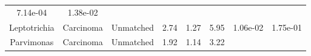 \documentclass[12pt,]{article}
\begin{document}
\begin{longtable}[]{@{}cccccccc@{}}
\begin{minipage}[t]{0.06\columnwidth}
7.14e-04\strut
\end{minipage} & \begin{minipage}[t]{0.06\columnwidth}\centering\strut
1.38e-02\strut
\end{minipage}\tabularnewline
\begin{minipage}[t]{0.19\columnwidth}\centering\strut
Leptotrichia\strut
\end{minipage} & \begin{minipage}[t]{0.07\columnwidth}\centering\strut
Carcinoma\strut
\end{minipage} & \begin{minipage}[t]{0.09\columnwidth}\centering\strut
Unmatched\strut
\end{minipage} & \begin{minipage}[t]{0.03\columnwidth}\centering\strut
2.74\strut
\end{minipage} & \begin{minipage}[t]{0.14\columnwidth}\centering\strut
1.27\strut
\end{minipage} & \begin{minipage}[t]{0.14\columnwidth}\centering\strut
5.95\strut
\end{minipage} & \begin{minipage}[t]{0.06\columnwidth}\centering\strut
1.06e-02\strut
\end{minipage} & \begin{minipage}[t]{0.06\columnwidth}\centering\strut
1.75e-01\strut
\end{minipage}\tabularnewline
\begin{minipage}[t]{0.19\columnwidth}\centering\strut
Parvimonas\strut
\end{minipage} & \begin{minipage}[t]{0.07\columnwidth}\centering\strut
Carcinoma\strut
\end{minipage} & \begin{minipage}[t]{0.09\columnwidth}\centering\strut
Unmatched\strut
\end{minipage} & \begin{minipage}[t]{0.03\columnwidth}\centering\strut
1.92\strut
\end{minipage} & \begin{minipage}[t]{0.14\columnwidth}\centering\strut
1.14\strut
\end{minipage} & \begin{minipage}[t]{0.14\columnwidth}\centering\strut
3.22\strut
\end{minipage} & \begin{minipage}[t]{0.06\columnwidth}\centering\strut

\end{minipage}
\end{longtable}
\end{document}
